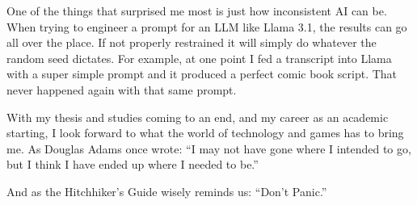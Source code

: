 One of the things that surprised me most is just how inconsistent AI can be. When trying to engineer a prompt for an LLM like Llama 3.1, the results can go all over the place. If not properly restrained it will simply do whatever the random seed dictates. For example, at one point I fed a transcript into Llama with a super simple prompt and it produced a perfect comic book script. That never happened again with that same prompt.

With my thesis and studies coming to an end, and my career as an academic starting, I look forward to what the world of technology and games has to bring me. As Douglas Adams once wrote: “I may not have gone where I intended to go, but I think I have ended up where I needed to be.”

And as the Hitchhiker's Guide wisely reminds us: “Don’t Panic.”